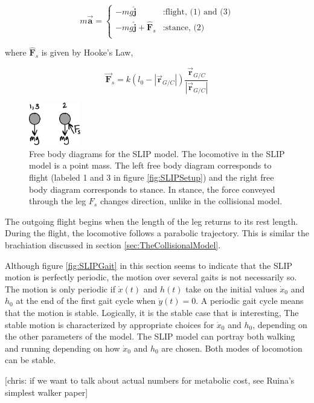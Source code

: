 \begin{displaymath}
   m\vec{\mathbf{a}} = \left\{
     \begin{array}{ll}
        -mg \hat{\mathbf{j}} & : \mbox{flight, (1) and (3)} \\
       -mg \hat{\mathbf{j}} + \hat{\mathbf{F}}_s & : \mbox{stance, (2)} \\
     \end{array}
   \right.
\end{displaymath}

where $\hat{\mathbf{F}}_s$ is given by Hooke's Law,

\begin{equation}
\vec{\mathbf{F}}_s = k (l_0 - |\vec{\mathbf{r}}_{G/C}| ) \frac{\vec{\mathbf{r}}_{G/C}}{|\vec{\mathbf{r}}_{G/C}|}
\end{equation}

\begin{figure}[h]		%
\begin{centering}
\includegraphics[width=0.2\textwidth]{Figures/SLIPFBD}\par
\end{centering}
\caption[Diagram: Free Body Diagrams for the SLIP Model]{Free body diagrams for the SLIP model. The locomotive in the SLIP model is a point mass. The left free body diagram corresponds to flight (labeled 1 and 3 in figure \ref{fig:SLIPSetup}) and the right free body diagram corresponds to stance. In stance, the force conveyed through the leg $F_{s}$ changes direction, unlike in the collisional model.}
\label{fig:SLIPFBD}
\end{figure}
%

The outgoing flight begins when the length of the leg returns to its rest length. During the flight, the locomotive follows a parabolic trajectory. This is similar the brachiation discussed in section \ref{sec:TheCollisionalModel}.

Although figure \ref{fig:SLIPGait} in this section seems to indicate that the SLIP motion is perfectly periodic, the motion over several gaits is not necessarily so. The motion is only periodic if $\dot{x}(t)$ and $h(t)$ take on the initial values $\dot{x}_{0}$ and $h_{0}$ at the end of the first gait cycle when $\dot{y}(t) = 0$. A periodic gait cycle means that the motion is stable. Logically, it is the stable case that is interesting, The stable motion is characterized by appropriate choices for $\dot{x}_0$ and $h_0$, depending on the other parameters of the model. The SLIP model can portray both walking and running depending on how $\dot{x}_0$ and $h_0$ are chosen. Both modes of locomotion can be stable.


[chris: if we want to talk about actual numbers for metabolic cost, see Ruina's simplest walker paper]
